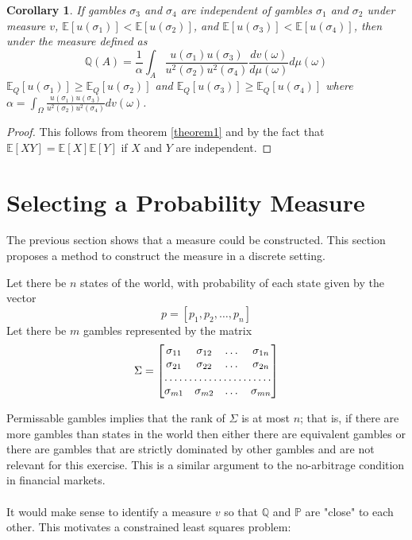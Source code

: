 \documentclass{article}
\newtheorem{corollary}{Corollary}
\begin{document}
\begin{corollary}\label{corr1}
	If gambles \(\sigma_3\) and \(\sigma_4\) are independent of gambles \(\sigma_1\) and \(\sigma_2\) under measure \(v\), \(\mathbb{E}[u(\sigma_1)] < \mathbb{E}[u(\sigma_2)]\), and \(\mathbb{E}[u(\sigma_3)] < \mathbb{E}[u(\sigma_4)]\), then under the measure defined as 
	\[\mathbb{Q}(A)=\frac{1}{\alpha}\int_A \frac{u(\sigma_1)u(\sigma_3)}{u^2(\sigma_2)u^2(\sigma_4)} \frac{dv(\omega) }{ d\mu(\omega)} d\mu(\omega)\]
	\(\mathbb{E}_Q[u(\sigma_1)]\geq\mathbb{E}_Q[u(\sigma_2)]\) and \(\mathbb{E}_Q[u(\sigma_3)]\geq\mathbb{E}_Q[u(\sigma_4)]\) where \(\alpha=\int_\Omega \frac{u(\sigma_1)u(\sigma_3)}{u^2(\sigma_2)u^2(\sigma_4)} dv(\omega) \).
\end{corollary}

\begin{proof}
This follows from theorem \ref{theorem1} and by the fact that \(\mathbb{E}[XY]=\mathbb{E}[X]\mathbb{E}[Y]\) if \(X\) and \(Y\) are independent.  
\end{proof}

\section{Selecting a Probability Measure}

The previous section shows that a measure could be constructed.  This section proposes a method to construct the measure in a discrete setting.

Let there be \(n\) states of the world, with probability of each state given by the vector 
\[p = [p_1, p_2, \dotsc, p_n]\]  
Let there be \(m\) gambles represented by the matrix 
\[\Sigma = \begin{bmatrix}
    \sigma_{11}       & \sigma_{12} & \dots & \sigma_{1n} \\
    \sigma_{21}       & \sigma_{22}  & \dots & \sigma_{2n} \\
    \hdotsfor{4} \\
    \sigma_{m1}       & \sigma_{m2} & \dots & \sigma_{mn}
\end{bmatrix}\]

Permissable gambles implies that the rank of \(\Sigma\) is at most \(n\); that is, if there are more gambles than states in the world then either there are equivalent gambles or there are gambles that are strictly dominated by other gambles and are not relevant for this exercise.  This is a similar argument to the no-arbitrage condition in financial markets.  
\\
\\
It would make sense to identify a measure \(v\) so that \(\mathbb{Q}\) and \(\mathbb{P}\) are "close" to each other.  This motivates a constrained least squares problem:
\end{document}
